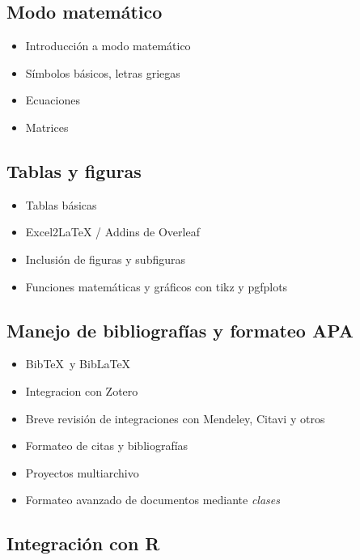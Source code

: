 \documentclass[a4paper,12pt]{article}
\begin{document}
\subsection{Modo matemático}

\begin{itemize}
    \item Introducción a modo matemático
    \item Símbolos básicos, letras griegas
    \item Ecuaciones
    \item Matrices
\end{itemize}

\subsection{Tablas y figuras}

\begin{itemize}
    \item Tablas básicas
    \item Excel2LaTeX / Addins de Overleaf
    \item Inclusión de figuras y subfiguras
    \item Funciones matemáticas y gráficos con \textsf{tikz} y \textsf{pgfplots}
\end{itemize}

\subsection{Manejo de bibliografías y formateo APA}
\begin{itemize}
    \item Bib\TeX \ y Bib\LaTeX
    \item Integracion con Zotero
    \item Breve revisión de integraciones con Mendeley, Citavi y otros
    \item Formateo de citas y bibliografías
    \item Proyectos multiarchivo
    \item Formateo avanzado de documentos mediante \textit{clases}
\end{itemize}

\subsection{Integración con R}
\end{document}
